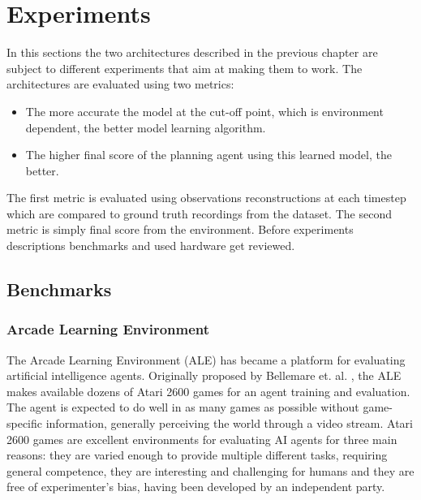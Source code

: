\section{Experiments}

In this sections the two architectures described in the previous chapter are subject to different experiments that aim at making them to work. The architectures are evaluated using two metrics:
\begin{itemize}
\item The more accurate the model at the cut-off point, which is environment dependent, the better model learning algorithm.
\item The higher final score of the planning agent using this learned model, the better.
\end{itemize}
The first metric is evaluated using observations reconstructions at each timestep which are compared to ground truth recordings from the dataset. The second metric is simply final score from the environment.
Before experiments descriptions benchmarks and used hardware get reviewed.

\subsection{Benchmarks}

\subsubsection{Arcade Learning Environment}


The Arcade Learning Environment (ALE) has became a platform for evaluating artificial intelligence agents. Originally proposed by Bellemare et. al. \cite{Code.ALE}, the ALE makes available dozens of Atari 2600 games for an agent training and evaluation. The agent is expected to do well in as many games as possible without game-specific information, generally perceiving the world through a video stream. Atari 2600 games are excellent environments for evaluating AI agents for three main reasons: they are varied enough to provide multiple different tasks, requiring general competence, they are interesting and challenging for humans and they are free of experimenter’s bias, having been developed by an independent party.

